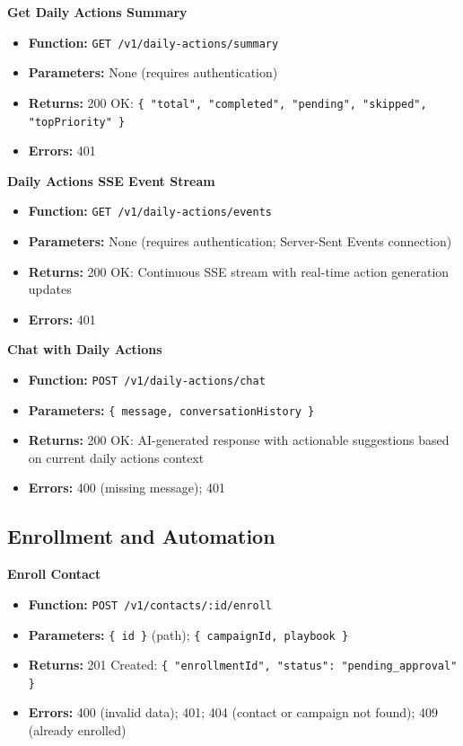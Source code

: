 \documentclass[a4paper]{article}
\begin{document}
\textbf{Get Daily Actions Summary}
\begin{itemize}
  \item \textbf{Function:} \texttt{GET /v1/daily-actions/summary}
  \item \textbf{Parameters:} None (requires authentication)
  \item \textbf{Returns:} 200 OK: \texttt{\{ "total", "completed", "pending", "skipped", "topPriority" \}}
  \item \textbf{Errors:} 401
\end{itemize}

\textbf{Daily Actions SSE Event Stream}
\begin{itemize}
  \item \textbf{Function:} \texttt{GET /v1/daily-actions/events}
  \item \textbf{Parameters:} None (requires authentication; Server-Sent Events connection)
  \item \textbf{Returns:} 200 OK: Continuous SSE stream with real-time action generation updates
  \item \textbf{Errors:} 401
\end{itemize}

\textbf{Chat with Daily Actions}
\begin{itemize}
  \item \textbf{Function:} \texttt{POST /v1/daily-actions/chat}
  \item \textbf{Parameters:} \texttt{\{ message, conversationHistory \}}
  \item \textbf{Returns:} 200 OK: AI-generated response with actionable suggestions based on current daily actions context
  \item \textbf{Errors:} 400 (missing message); 401
\end{itemize}

\subsection{Enrollment and Automation}

\textbf{Enroll Contact}
\begin{itemize}
  \item \textbf{Function:} \texttt{POST /v1/contacts/:id/enroll}
  \item \textbf{Parameters:} \texttt{\{ id \}} (path); \texttt{\{ campaignId, playbook \}}
  \item \textbf{Returns:} 201 Created: \texttt{\{ "enrollmentId", "status": "pending\_approval" \}}
  \item \textbf{Errors:} 400 (invalid data); 401; 404 (contact or campaign not found); 409 (already enrolled)
\end{itemize}
\end{document}
